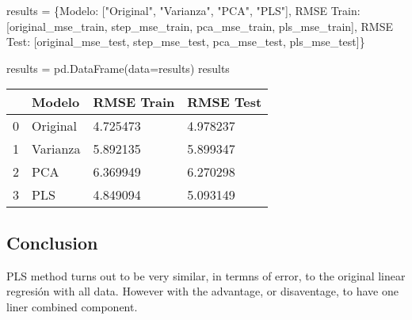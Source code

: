 \documentclass[
  letterpaper,
  DIV=11,
  numbers=noendperiod]{scrartcl}
\newenvironment{Shaded}{\begin{snugshade}}{\end{snugshade}}
\newcommand{\NormalTok}[1]{\textcolor[rgb]{0.00,0.23,0.31}{#1}}
\newcommand{\OperatorTok}[1]{\textcolor[rgb]{0.37,0.37,0.37}{#1}}
\newcommand{\StringTok}[1]{\textcolor[rgb]{0.13,0.47,0.30}{#1}}
\begin{document}
\begin{Shaded}
\begin{Highlighting}[]
\NormalTok{results }\OperatorTok{=}\NormalTok{ \{}\StringTok{\textquotesingle{}Modelo\textquotesingle{}}\NormalTok{: [}\StringTok{"Original"}\NormalTok{, }\StringTok{"Varianza"}\NormalTok{, }\StringTok{"PCA"}\NormalTok{, }\StringTok{"PLS"}\NormalTok{],}
           \StringTok{\textquotesingle{}RMSE Train\textquotesingle{}}\NormalTok{: [original\_mse\_train, step\_mse\_train, pca\_mse\_train, pls\_mse\_train],}
           \StringTok{\textquotesingle{}RMSE Test\textquotesingle{}}\NormalTok{: [original\_mse\_test, step\_mse\_test, pca\_mse\_test, pls\_mse\_test]\}}

\NormalTok{results }\OperatorTok{=}\NormalTok{ pd.DataFrame(data}\OperatorTok{=}\NormalTok{results)}
\NormalTok{results}
\end{Highlighting}
\end{Shaded}

\begin{longtable}[]{@{}llll@{}}
\toprule()
& Modelo & RMSE Train & RMSE Test \\
\midrule()
\endhead
0 & Original & 4.725473 & 4.978237 \\
1 & Varianza & 5.892135 & 5.899347 \\
2 & PCA & 6.369949 & 6.270298 \\
3 & PLS & 4.849094 & 5.093149 \\
\bottomrule()
\end{longtable}

\hypertarget{conclusion}{%
\subsection{Conclusion}\label{conclusion}}

PLS method turns out to be very similar, in termns of error, to the
original linear regresión with all data. However with the advantage, or
disaventage, to have one liner combined component.
\end{document}
